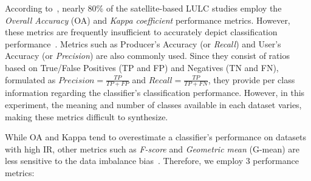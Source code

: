 \documentclass[parskip=full]{scrartcl}
\begin{document}
According to~\cite{Gavade2019}, nearly 80\% of the satellite-based LULC studies
employ the \textit{Overall Accuracy} (OA) and \textit{Kappa coefficient}
performance metrics. However, these metrics are frequently insufficient to
accurately depict classification performance~\cite{Olofsson2013, Pontius2011}.
Metrics such as Producer's Accuracy (or \textit{Recall}) and User's Accuracy (or
\textit{Precision}) are also commonly used. Since they consist of ratios based on
True/False Positives (TP and FP) and Negatives (TN and FN), formulated as
$Precision = \frac{TP}{TP+FP}$ and $Recall = \frac{TP}{TP+FN}$, they provide per
class information regarding the classifier's classification performance.
However, in this experiment, the meaning and number of classes available in each
dataset varies, making these metrics difficult to synthesize.

While OA and Kappa tend to overestimate a classifier's performance on datasets
with high IR, other metrics such as \textit{F-score} and \textit{Geometric mean}
(G-mean) are less sensitive to the data imbalance bias~\cite{Jeni2013,
Kubat1997}. Therefore, we employ 3 performance metrics:
\end{document}
